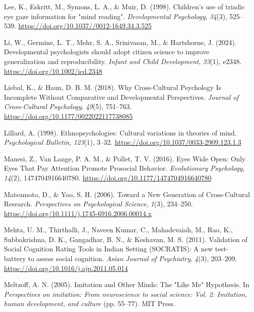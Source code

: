 \documentclass[
  man,floatsintext]{apa7}
\newlength{\cslhangindent}
\newenvironment{CSLReferences}[2] %
 {\begin{list}{}{%
  \setlength{\itemindent}{0pt}
  \setlength{\leftmargin}{0pt}
  \setlength{\parsep}{0pt}
  \ifodd #1
   \setlength{\leftmargin}{\cslhangindent}
   \setlength{\itemindent}{-1\cslhangindent}
  \fi
  \setlength{\itemsep}{#2\baselineskip}}}
 {\end{list}}
\begin{document}
\begin{CSLReferences}{1}{0}
Lee, K., Eskritt, M., Symons, L. A., \& Muir, D. (1998). Children's use of triadic eye gaze information for "mind reading". \emph{Developmental Psychology}, \emph{34}(3), 525--539. \url{https://doi.org/10.1037//0012-1649.34.3.525}

Li, W., Germine, L. T., Mehr, S. A., Srinivasan, M., \& Hartshorne, J. (2024). Developmental psychologists should adopt citizen science to improve generalization and reproducibility. \emph{Infant and Child Development}, \emph{33}(1), e2348. \url{https://doi.org/10.1002/icd.2348}

Liebal, K., \& Haun, D. B. M. (2018). Why {Cross-Cultural Psychology Is Incomplete Without Comparative} and {Developmental Perspectives}. \emph{Journal of Cross-Cultural Psychology}, \emph{49}(5), 751--763. \url{https://doi.org/10.1177/0022022117738085}

Lillard, A. (1998). Ethnopsychologies: {Cultural} variations in theories of mind. \emph{Psychological Bulletin}, \emph{123}(1), 3--32. \url{https://doi.org/10.1037/0033-2909.123.1.3}

Manesi, Z., Van Lange, P. A. M., \& Pollet, T. V. (2016). Eyes {Wide Open}: {Only Eyes That Pay Attention Promote Prosocial Behavior}. \emph{Evolutionary Psychology}, \emph{14}(2), 1474704916640780. \url{https://doi.org/10.1177/1474704916640780}

Matsumoto, D., \& Yoo, S. H. (2006). Toward a {New Generation} of {Cross-Cultural Research}. \emph{Perspectives on Psychological Science}, \emph{1}(3), 234--250. \url{https://doi.org/10.1111/j.1745-6916.2006.00014.x}

Mehta, U. M., Thirthalli, J., Naveen Kumar, C., Mahadevaiah, M., Rao, K., Subbakrishna, D. K., Gangadhar, B. N., \& Keshavan, M. S. (2011). Validation of {Social Cognition Rating Tools} in {Indian Setting} ({SOCRATIS}): {A} new test-battery to assess social cognition. \emph{Asian Journal of Psychiatry}, \emph{4}(3), 203--209. \url{https://doi.org/10.1016/j.ajp.2011.05.014}

Meltzoff, A. N. (2005). Imitation and {Other Minds}: {The} "{Like Me}" {Hypothesis}. In \emph{Perspectives on imitation: {From} neuroscience to social science: {Vol}. 2: {Imitation}, human development, and culture} (pp. 55--77). MIT Press.


\end{CSLReferences}
\end{document}
